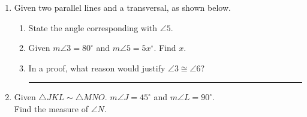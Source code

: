 \documentclass[12pt, twoside]{article}
\begin{document}
\begin{enumerate}
\item Given two parallel lines and a transversal, as shown below.
  \begin{center}
  \end{center}
  \begin{enumerate}
    \item State the angle corresponding with $\angle 5$. \vspace{1cm}
    \item Given $m\angle 3 = 80^\circ$ and $m\angle 5 = 5x^\circ$. Find $x$. \vspace{3.5cm}
    \item In a proof, what reason would justify $\angle 3 \cong \angle 6$? \rule{6cm}{0.15mm}
  \end{enumerate} \vspace{2cm}

   \item Given $\triangle JKL \sim \triangle MNO$. $m\angle J = 45^\circ$ and $m\angle L = 90^\circ$.\\
   Find the measure of $\angle N$. \vspace{1.5cm}

\end{enumerate}
\end{document}
